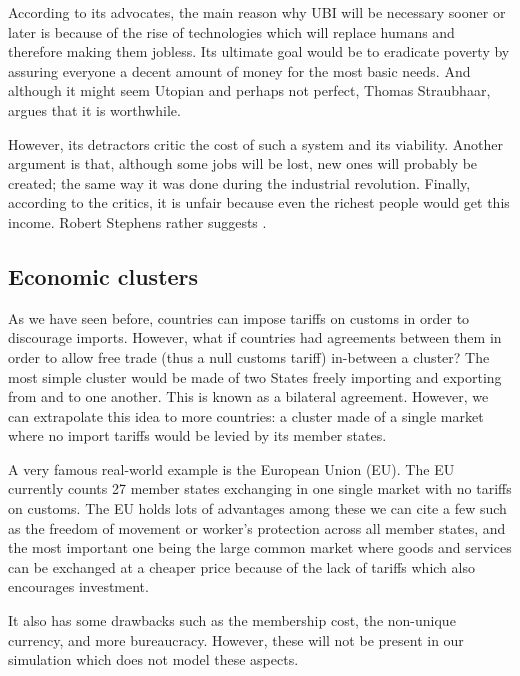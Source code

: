 \documentclass[12pt]{article}
\begin{document}
    According to its advocates, the main reason why UBI will be necessary sooner or later is because of the rise of technologies which will replace humans and therefore making them jobless. Its ultimate goal would be to eradicate poverty by assuring everyone a decent amount of money for the most basic needs. And although it might seem Utopian and perhaps not perfect, Thomas Straubhaar, argues that it is worthwhile.\cite{straubhaar2017economics}
    
    However, its detractors critic the cost of such a system and its viability. Another argument is that, although some jobs will be lost, new ones will probably be created; the same way it was done during the industrial revolution. Finally, according to the critics, it is unfair because even the richest people would get this income. Robert Stephens rather suggests  \cite{stephens2019universal}.

    
\subsection{Economic clusters}
    As we have seen before, countries can impose tariffs on customs in order to discourage imports. However, what if countries had agreements between them in order to allow free trade (thus a null customs tariff) in-between a cluster? The most simple cluster would be made of two States freely importing and exporting from and to one another. This is known as a bilateral agreement. However, we can extrapolate this idea to more countries: a cluster made of a single market where no import tariffs would be levied by its member states.
    
    A very famous real-world example is the European Union (EU). The EU currently counts 27 member states exchanging in one single market with no tariffs on customs. The EU holds lots of advantages among these we can cite a few such as the freedom of movement or worker's protection across all member states, and the most important one being the large common market where goods and services can be exchanged at a cheaper price because of the lack of tariffs which also encourages investment.
    
    It also has some drawbacks such as the membership cost, the non-unique currency, and more bureaucracy. However, these will not be present in our simulation which does not model these aspects.
    
\end{document}
